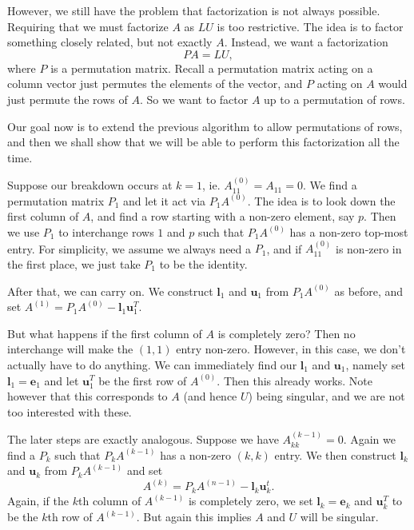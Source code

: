 \documentclass[a4paper]{article}
\begin{document}
However, we still have the problem that factorization is not always possible. Requiring that we must factorize $A$ as $LU$ is too restrictive. The idea is to factor something closely related, but not exactly $A$. Instead, we want a factorization
\[
  PA = LU,
\]
where $P$ is a permutation matrix. Recall a permutation matrix acting on a column vector just permutes the elements of the vector, and $P$ acting on $A$ would just permute the rows of $A$. So we want to factor $A$ up to a permutation of rows.

Our goal now is to extend the previous algorithm to allow permutations of rows, and then we shall show that we will be able to perform this factorization all the time.

Suppose our breakdown occurs at $k = 1$, ie. $A_{11}^{(0)} = A_{11} = 0$. We find a permutation matrix $P_1$ and let it act via $P_1A^{(0)}$. The idea is to look down the first column of $A$, and find a row starting with a non-zero element, say $p$. Then we use $P_1$ to interchange rows $1$ and $p$ such that $P_1A^{(0)}$ has a non-zero top-most entry. For simplicity, we assume we always need a $P_1$, and if $A_{11}^{(0)}$ is non-zero in the first place, we just take $P_1$ to be the identity.

After that, we can carry on. We construct $\mathbf{l}_1$ and $\mathbf{u}_1$ from $P_1A^{(0)}$ as before, and set $A^{(1)} = P_1A^{(0)} - \mathbf{l}_1 \mathbf{u}_1^T$.

But what happens if the first column of $A$ is completely zero? Then no interchange will make the $(1, 1)$ entry non-zero. However, in this case, we don't actually have to do anything. We can immediately find our $\mathbf{l}_1$ and $\mathbf{u}_1$, namely set $\mathbf{l}_1 = \mathbf{e}_1$ and let $\mathbf{u}_1^T$ be the first row of $A^{(0)}$. Then this already works. Note however that this corresponds to $A$ (and hence $U$) being singular, and we are not too interested with these.

The later steps are exactly analogous. Suppose we have $A_{kk}^{(k - 1)} = 0$. Again we find a $P_k$ such that $P_k A^{(k - 1)}$ has a non-zero $(k, k)$ entry. We then construct $\mathbf{l}_k$ and $\mathbf{u}_k$ from $P_k A^{(k - 1)}$ and set
\[
  A^{(k)} = P_k A^{(n - 1)} - \mathbf{l}_k \mathbf{u}_k^t.
\]
Again, if the $k$th column of $A^{(k - 1)}$ is completely zero, we set $\mathbf{l}_k = \mathbf{e}_k$ and $\mathbf{u}_k^T$ to be the $k$th row of $A^{(k - 1)}$. But again this implies $A$ and $U$ will be singular.
\end{document}
